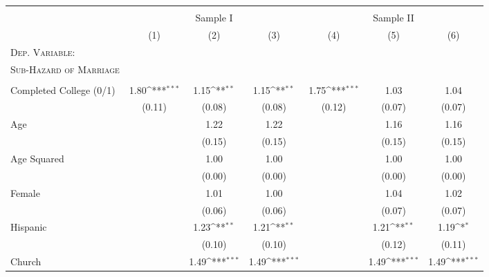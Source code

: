 {\def\sym#1{\ifmmode^{#1}\else\(^{#1}\)\fi}              \begin{tabular}{l*{6}{c}}                          \toprule          
		\\[-1.8ex] & \multicolumn{3}{c}{Sample I} & \multicolumn{3}{c}{Sample II} \\ 
		\cmidrule(lr){2-4} \cmidrule(lr){5-7} 	
		   &\multicolumn{1}{c}{(1)}  &\multicolumn{1}{c}{(2)}  &\multicolumn{1}{c}{(3)}         &\multicolumn{1}{c}{(4)} &\multicolumn{1}{c}{(5)}  &\multicolumn{1}{c}{(6)}        \\             \midrule             \textsc{Dep. Variable:} & & & & & & \\\textsc{Sub-Hazard of Marriage} & & & & & & \\ & & & & & & \\
Completed College (0/1)&     1.80\sym{***}&     1.15\sym{**} &     1.15\sym{**} &     1.75\sym{***}&     1.03         &     1.04         \\
                &   (0.11)         &   (0.08)         &   (0.08)         &   (0.12)         &   (0.07)         &   (0.07)         \\
Age             &                  &     1.22         &     1.22         &                  &     1.16         &     1.16         \\
                &                  &   (0.15)         &   (0.15)         &                  &   (0.15)         &   (0.15)         \\
Age Squared     &                  &     1.00         &     1.00         &                  &     1.00         &     1.00         \\
                &                  &   (0.00)         &   (0.00)         &                  &   (0.00)         &   (0.00)         \\
Female          &                  &     1.01         &     1.00         &                  &     1.04         &     1.02         \\
                &                  &   (0.06)         &   (0.06)         &                  &   (0.07)         &   (0.07)         \\
Hispanic        &                  &     1.23\sym{**} &     1.21\sym{**} &                  &     1.21\sym{**} &     1.19\sym{*}  \\
                &                  &   (0.10)         &   (0.10)         &                  &   (0.12)         &   (0.11)         \\
Church          &                  &     1.49\sym{***}&     1.49\sym{***}&                  &     1.49\sym{***}&     1.49\sym{***}\\

\end{tabular}}
